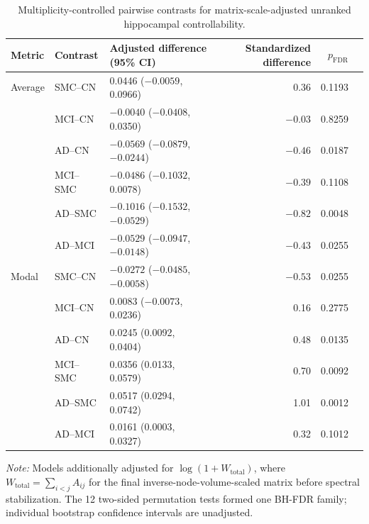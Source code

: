 \documentclass{article}
\begin{document}
\begin{table}[!htbp]
\color{blue}
\centering
\caption{Multiplicity-controlled pairwise contrasts for matrix-scale-adjusted unranked hippocampal controllability.}
\label{tab:raw_pairwise}
\scriptsize
\begin{tabular}{lllrrr}
\toprule
Metric & Contrast & Adjusted difference (95\% CI) & Standardized difference & $p_{\mathrm{FDR}}$\\
\midrule
Average & SMC--CN & 0.0446 ($-0.0059$, 0.0966) & 0.36 & 0.1193\\
& MCI--CN & $-0.0040$ ($-0.0408$, 0.0350) & $-0.03$ & 0.8259\\
& AD--CN & $-0.0569$ ($-0.0879$, $-0.0244$) & $-0.46$ & 0.0187\\
& MCI--SMC & $-0.0486$ ($-0.1032$, 0.0078) & $-0.39$ & 0.1108\\
& AD--SMC & $-0.1016$ ($-0.1532$, $-0.0529$) & $-0.82$ & 0.0048\\
& AD--MCI & $-0.0529$ ($-0.0947$, $-0.0148$) & $-0.43$ & 0.0255\\
\addlinespace
Modal & SMC--CN & $-0.0272$ ($-0.0485$, $-0.0058$) & $-0.53$ & 0.0255\\
& MCI--CN & 0.0083 ($-0.0073$, 0.0236) & 0.16 & 0.2775\\
& AD--CN & 0.0245 (0.0092, 0.0404) & 0.48 & 0.0135\\
& MCI--SMC & 0.0356 (0.0133, 0.0579) & 0.70 & 0.0092\\
& AD--SMC & 0.0517 (0.0294, 0.0742) & 1.01 & 0.0012\\
& AD--MCI & 0.0161 (0.0003, 0.0327) & 0.32 & 0.1012\\
\bottomrule
\end{tabular}
\par\vspace{1mm}
\footnotesize{\textit{Note:} Models additionally adjusted for $\log(1+W_{\mathrm{total}})$, where $W_{\mathrm{total}}=\sum_{i<j}A_{ij}$ for the final inverse-node-volume-scaled matrix before spectral stabilization. The 12 two-sided permutation tests formed one BH-FDR family; individual bootstrap confidence intervals are unadjusted.}
\end{table}
\end{document}
